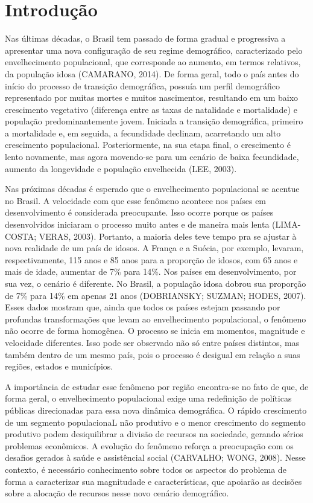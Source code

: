 \documentclass[10pt,twoside]{article}
\begin{document}
	\section{Introdução}
Nas últimas décadas, o Brasil tem passado de forma gradual e progressiva a apresentar uma nova configuração de seu regime demográfico, caracterizado pelo envelhecimento populacional, que corresponde ao aumento, em termos relativos, da população idosa (CAMARANO, 2014). De forma geral, todo o país antes do início do processo de transição demográfica, possuía um perfil demográfico representado por muitas mortes e muitos nascimentos, resultando em um baixo crescimento vegetativo (diferença entre as taxas de natalidade e mortalidade) e população predominantemente jovem. Iniciada a transição demográfica, primeiro a mortalidade e, em seguida, a fecundidade declinam, acarretando um alto crescimento populacional. Posteriormente, na sua etapa final, o crescimento é lento novamente, mas agora movendo-se para um cenário de baixa fecundidade, aumento da longevidade e população envelhecida (LEE, 2003).

Nas próximas décadas é esperado que o envelhecimento populacional se acentue no Brasil. A velocidade com que esse fenômeno acontece nos países em desenvolvimento é considerada preocupante. Isso ocorre porque os países desenvolvidos iniciaram o processo muito antes e de maneira mais lenta (LIMA-COSTA; VERAS, 2003).
Portanto, a maioria deles teve tempo pra se ajustar à nova realidade de um país de idosos. A França e a Suécia, por exemplo, levaram, respectivamente, 115 anos e 85 anos para a proporção de idosos, com 65 anos e mais de idade, aumentar de 7\% para 14\%. Nos países em desenvolvimento, por sua vez, o cenário é diferente. No Brasil, a população idosa dobrou sua proporção de 7\% para 14\% em apenas 21 anos (DOBRIANSKY; SUZMAN; HODES, 2007). Esses dados mostram que, ainda que todos os países estejam passando por profundas transformações que levam ao envelhecimento populacional, o fenômeno não ocorre de forma homogênea. O processo se inicia em momentos, magnitude e velocidade diferentes. Isso pode ser observado não só entre países distintos, mas também dentro de um mesmo país, pois o processo é desigual em relação a suas regiões, estados e municípios.  

A importância de estudar esse fenômeno por região encontra-se no fato de que, de forma geral, o envelhecimento populacional exige uma redefinição de políticas públicas direcionadas para essa nova dinâmica demográfica. O rápido crescimento de um segmento populacionaL não produtivo e o menor crescimento do segmento produtivo podem desiquilibrar a divisão de recursos na sociedade, gerando sérios problemas econômicos. A evolução do fenômeno reforça a preocupação com os desafios gerados à saúde e assistêncial social (CARVALHO; WONG, 2008).  Nesse contexto, é necessário conhecimento sobre todos os aspectos do problema de forma a caracterizar sua magnitudade e características, que apoiarão as decisões sobre a alocação de recursos nesse novo cenário demográfico.
\end{document}

